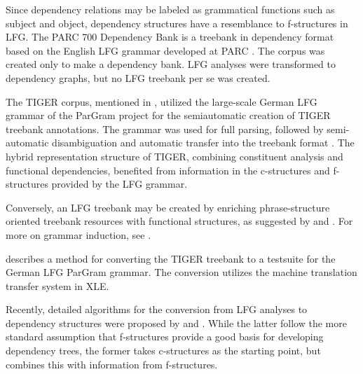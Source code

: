 \documentclass[output=paper,hidelinks]{langscibook}
\begin{document}
Since dependency relations may be labeled as grammatical functions such as subject and object, dependency structures have a resemblance to f-structures in LFG.
The PARC 700 Dependency Bank is a treebank in dependency format based on the English LFG grammar developed at PARC \citep{Parc700}.
The corpus was created only to make a dependency bank.
LFG analyses were transformed to dependency graphs, but no LFG treebank per se was created.

The TIGER corpus, mentioned in , utilized the large-scale German LFG grammar of the ParGram project for the semiautomatic creation of TIGER treebank annotations.
The grammar was used for full parsing, followed by semi-automatic disambiguation and automatic transfer into the treebank format \citep{zinsmeisteretal02}.
The hybrid representation structure of TIGER, combining constituent analysis and functional dependencies, benefited from information in the c-structures and f-structures provided by the LFG grammar.

Conversely, an LFG treebank may be created by enriching phrase-structure oriented treebank resources with functional structures, as suggested by \citet{Frank03} and \citet{Cahill04thesis}.
For more on grammar induction, see .

\citet{forst-2003-treebank} describes a method for converting the TIGER treebank to a testsuite for the German LFG ParGram grammar.
The conversion utilizes the machine translation transfer system in XLE.

Recently, detailed algorithms for the conversion from LFG analyses to dependency structures were proposed by \citet{Meurer17LFG} and \citet{prz:pat:19:lre}.
While the latter follow the more standard assumption that f-structures provide a good basis for developing dependency trees, the former takes c-struc\-tures as the starting point, but combines this with information from f-structures.



\end{document}
